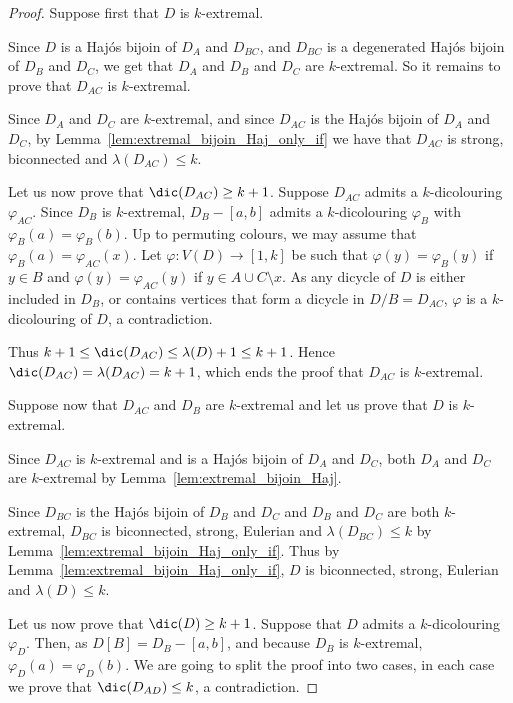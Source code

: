 \begin{proof}
    Suppose first that $D$ is $k$-extremal. 

    Since $D$ is a Haj\'os bijoin of $D_{A}$ and $D_{BC}$, and $D_{BC}$ is a degenerated Haj\'os bijoin of $D_{B}$ and $D_{C}$, we get that $D_A$ and $D_B$ and $D_C$ are $k$-extremal. 
    So it remains to prove that $D_{AC}$ is $k$-extremal. 
    
    Since $D_A$ and $D_C$ are  $k$-extremal, and since $D_{AC}$ is the Haj\'os bijoin of $D_A$ and $D_C$, by Lemma~\ref{lem:extremal_bijoin_Haj_only_if} we have that $D_{AC}$ is strong, biconnected and $\lambda(D_{AC}) \leq k$.

    Let us now prove that $\dic(D_{AC}) \geq k+1$. Suppose $D_{AC}$ admits a $k$-dicolouring $\varphi_{AC}$. Since $D_B$ is $k$-extremal, $D_B - [a,b]$ admits a $k$-dicolouring $\varphi_B$ with $\varphi_B(a) = \varphi_B(b)$. 
    Up to permuting colours, we may assume that $\varphi_B(a) = \varphi_{AC}(x)$. Let $\varphi: V(D) \to [1,k]$ be such that $\varphi(y) = \varphi_{B}(y)$ if $y \in B$ and $\varphi(y) = \varphi_{AC}(y)$ if $y \in A \cup C \setminus x$. As any dicycle of $D$  is either included in $D_B$, or contains vertices that form a dicycle in $D/B = D_{AC}$, $\varphi$ is a $k$-dicolouring of $D$, a contradiction. 

    Thus $k+1 \leq \dic(D_{AC}) \leq \lambda(D) + 1 \leq k+1$. Hence $\dic(D_{AC}) = \lambda(D_{AC})=k+1$, which ends the proof that $D_{AC}$ is $k$-extremal. 
    \bigskip 

    Suppose now that $D_{AC}$ and $D_{B}$ are $k$-extremal and let us prove that $D$ is $k$-extremal. 

    Since $D_{AC}$ is $k$-extremal and is a Haj\'os bijoin of $D_A$ and $D_C$, both $D_A$ and $D_C$ are $k$-extremal by Lemma~\ref{lem:extremal_bijoin_Haj}. 
    
    Since $D_{BC}$ is the Haj\'os bijoin of $D_B$ and $D_C$ and $D_B$ and $D_C$ are both $k$-extremal, $D_{BC}$ is biconnected, strong, Eulerian and $\lambda(D_{BC}) \leq k$  by Lemma~\ref{lem:extremal_bijoin_Haj_only_if}. 
    Thus by Lemma~\ref{lem:extremal_bijoin_Haj_only_if}, $D$ is biconnected, strong, Eulerian and $\lambda(D) \leq k$. 
    
    Let us now prove that $\dic(D) \geq k + 1$. Suppose that $D$ admits a $k$-dicolouring $\varphi_D$.
    Then, as $D[B] = D_{B} - [a,b]$, and because $D_B$ is $k$-extremal, $\varphi_D(a) = \varphi_D(b)$.  
    We are going to split the proof into two cases, in each case we prove that $\dic(D_{AD}) \leq k$, a contradiction. 
    

\end{proof}
